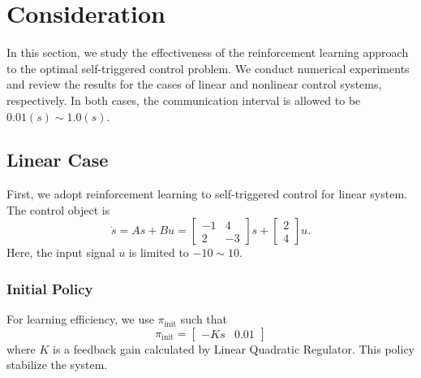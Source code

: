 \documentclass[english, dvipdfmx]{ampmt}             %
\begin{document}
\section{Consideration}
In this section, we study the effectiveness of the reinforcement learning approach to the optimal self-triggered control problem. We conduct numerical experiments and review the results for the cases of linear and nonlinear control systems, respectively. In both cases, the communication interval is allowed to be $0.01 (s) \sim 1.0 (s)$. 

\subsection{Linear Case}
First, we adopt reinforcement learning to self-triggered control for linear system. The control object is
\begin{equation}
	\dot{s} = As + Bu = \begin{bmatrix}-1& 4 \\ 2 & -3\end{bmatrix}s + \begin{bmatrix}2 \\ 4\end{bmatrix}u.
\end{equation}
Here, the input signal $u$ is limited to $-10 \sim 10$.

\subsubsection{Initial Policy}
For learning efficiency, we use $\pi_{\textrm{init}}$ such that
\begin{equation}
	\pi_{\textrm{init}} = \begin{bmatrix}-Ks&0.01\end{bmatrix}
\end{equation}
where $K$ is a feedback gain calculated by Linear Quadratic Regulator. This policy stabilize the system.
\end{document}
